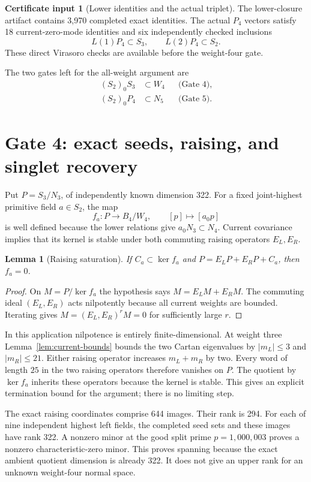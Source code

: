 \documentclass[11pt,a4paper]{article}
\newtheorem{lemma}[theorem]{Lemma}
\theoremstyle{definition}
\newtheorem{certificate}[theorem]{Certificate input}
\begin{document}
\begin{certificate}[Lower identities and the actual triplet]\label{cert:lower}
The lower-closure artifact contains 3,970 completed exact identities.
The actual \(P_4\) vectors satisfy 18 current-zero-mode identities and
six independently checked inclusions
\[
 L(1)P_4\subset S_3,\qquad L(2)P_4\subset S_2.
\]
These direct Virasoro checks are available before the weight-four gate.
\end{certificate}
The two gates left for the all-weight argument are
\begin{align}
 (S_2)_0S_3&\subset W_4 &&\text{(Gate 4)},\label{eq:gate4}\\
 (S_2)_0P_4&\subset N_5 &&\text{(Gate 5)}.\label{eq:gate5}
\end{align}

\section{Gate 4: exact seeds, raising, and singlet recovery}\label{sec:gate4}
Put \(P=S_3/N_3\), of independently known dimension 322. For a fixed
joint-highest primitive field \(a\in S_2\), the map
\[
 f_a:P\longrightarrow B_4/W_4,\qquad [p]\longmapsto[a_0p]
\]
is well defined because the lower relations give \(a_0N_3\subset N_4\).
Current covariance implies that its kernel is stable under both commuting
raising operators \(E_L,E_R\).

\begin{lemma}[Raising saturation]\label{lem:raising}
If \(C_a\subset\ker f_a\) and
\(P=E_LP+E_RP+C_a\), then \(f_a=0\).
\end{lemma}
\begin{proof}
On \(M=P/\ker f_a\) the hypothesis says
\(M=E_LM+E_RM\). The commuting ideal \((E_L,E_R)\) acts nilpotently
because all current weights are bounded. Iterating gives
\(M=(E_L,E_R)^rM=0\) for sufficiently large \(r\).
\end{proof}

In this application nilpotence is entirely finite-dimensional. At weight
three Lemma~\ref{lem:current-bounds} bounds the two Cartan eigenvalues
by $|m_L|\leq3$ and $|m_R|\leq21$. Either raising operator increases
$m_L+m_R$ by two. Every word of length $25$ in the two raising
operators therefore vanishes on $P$. The quotient by $\ker f_a$
inherits these operators because the kernel is stable. This gives an
explicit termination bound for the argument; there is no limiting step.

The exact raising coordinates comprise 644 images. Their rank is 294.
For each of nine independent highest left fields, the completed seed
sets and these images have rank 322. A nonzero minor at the good split
prime \(p=1{,}000{,}003\) proves a nonzero characteristic-zero minor.
This proves spanning because the exact ambient quotient dimension is
already 322. It does not give an upper rank for an unknown weight-four
normal space.
\end{document}
